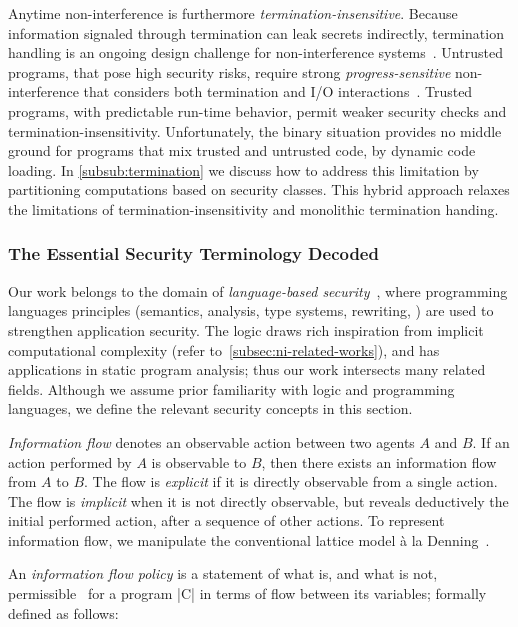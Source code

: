 Anytime non-interference is furthermore \emph{termination-insensitive}. Because
information signaled through termination can leak secrets indirectly,
termination handling is an ongoing design challenge for non-interference
systems~\cite{bay2020}. Untrusted programs, that pose high security risks,
require strong \emph{progress-sensitive} non-interference that considers both
termination and I/O interactions~\cite{hedin2012}. Trusted programs, with
predictable run-time behavior, permit weaker security checks and
termination-insensitivity. Unfortunately, the binary situation provides no
middle ground for programs that mix trusted and untrusted code, \eg by dynamic
code loading. In \autoref{subsub:termination} we discuss how to address this
limitation by partitioning computations based on security classes. This hybrid
approach relaxes the limitations of termination-insensitivity and monolithic
termination handing.

\subsubsection{The Essential Security Terminology Decoded}
\label{subsubsec:ni-terms}

Our work belongs to the domain of \emph{language-based
security}~\cite{schneider2001,sabelfeld2003}, where programming languages
principles (semantics, analysis, type systems, rewriting, \etc) are used to
strengthen application security. The \lname logic draws rich inspiration from
implicit computational complexity (refer to~\autoref{subsec:ni-related-works}), and
has applications in static program analysis; thus our work intersects many
related fields. Although we assume prior familiarity with logic and programming
languages, we define the relevant security concepts in this section.

\emph{Information flow} denotes an observable action between two agents \(A\)
and \(B\). If an action performed by \(A\) is observable to \(B\), then there
exists an information flow from \(A\) to \(B\). The flow is \emph{explicit} if
it is directly observable from a single action. The flow is \emph{implicit} when
it is not directly observable, but reveals deductively the initial performed
action, after a sequence of other actions. To represent information flow, we
manipulate the conventional lattice model à la Denning~\cite{denning76}.

An \emph{information flow policy} is a statement of what is, and what is not,
permissible~\cite{bishop2003} for a program \prc|C| in terms of flow between its
variables; formally defined as follows:

